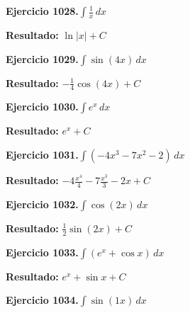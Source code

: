 \documentclass[10pt,a4paper]{article}
\begin{document}
\begin{ejbox}
\textbf{Ejercicio 1028.}\quad $\int \frac{1}{x}\,dx$
\end{ejbox}

\begin{solbox}
\textbf{Resultado:} \(\displaystyle \ln|x| + C\)
\end{solbox}

\begin{ejbox}
\textbf{Ejercicio 1029.}\quad $\int \sin(4x)\,dx$
\end{ejbox}

\begin{solbox}
\textbf{Resultado:} \(\displaystyle -\frac{1}{4}\cos(4x) + C\)
\end{solbox}

\newpage
\begin{ejbox}
\textbf{Ejercicio 1030.}\quad $\int e^x\,dx$
\end{ejbox}

\begin{solbox}
\textbf{Resultado:} \(\displaystyle e^x + C\)
\end{solbox}

\begin{ejbox}
\textbf{Ejercicio 1031.}\quad $\int (-4x^3 -7x^2 -2)\,dx$
\end{ejbox}

\begin{solbox}
\textbf{Resultado:} \(\displaystyle -4\frac{x^4}{4} -7\frac{x^3}{3} -2x + C\)
\end{solbox}

\begin{ejbox}
\textbf{Ejercicio 1032.}\quad $\int \cos(2x)\,dx$
\end{ejbox}

\begin{solbox}
\textbf{Resultado:} \(\displaystyle \frac{1}{2}\sin(2x) + C\)
\end{solbox}

\newpage
\begin{ejbox}
\textbf{Ejercicio 1033.}\quad $\int (e^x + \cos x)\,dx$
\end{ejbox}

\begin{solbox}
\textbf{Resultado:} \(\displaystyle e^x + \sin x + C\)
\end{solbox}

\begin{ejbox}
\textbf{Ejercicio 1034.}\quad $\int \sin(1x)\,dx$
\end{ejbox}
\end{document}

